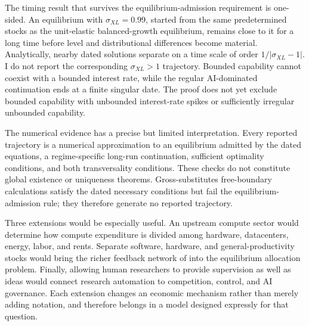 The timing result that survives the equilibrium-admission requirement is
one-sided. An equilibrium with \(\sigma_{XL}=0.99\), started from the same
predetermined stocks as the unit-elastic balanced-growth equilibrium, remains
close to it for a long time before level and distributional differences become
material. Analytically, nearby dated solutions separate on a time scale of
order \(1/|\sigma_{XL}-1|\). I do not report the corresponding
\(\sigma_{XL}>1\) trajectory. Bounded capability cannot coexist with a bounded
interest rate, while the regular AI-dominated continuation ends at a finite
singular date. The proof does not yet exclude bounded capability with
unbounded interest-rate spikes or sufficiently irregular unbounded capability.

The numerical evidence has a precise but limited interpretation. Every
reported trajectory is a numerical approximation to an equilibrium admitted by
the dated equations, a regime-specific long-run continuation, sufficient
optimality conditions, and both transversality conditions. These checks do not constitute global
existence or uniqueness theorems. Gross-substitutes free-boundary calculations
satisfy the dated necessary conditions but fail the equilibrium-admission rule;
they therefore generate no reported trajectory.

Three extensions would be especially useful. An upstream compute sector would
determine how compute expenditure is divided among hardware, datacenters,
energy, labor, and rents. Separate software, hardware, and general-productivity
stocks would bring the richer feedback network of \citet{davidsonetal2026} into
the equilibrium allocation problem. Finally, allowing human researchers to
provide supervision as well as ideas would connect research automation to
competition, control, and AI governance. Each extension changes an economic
mechanism rather than merely adding notation, and therefore belongs in a model
designed expressly for that question.
